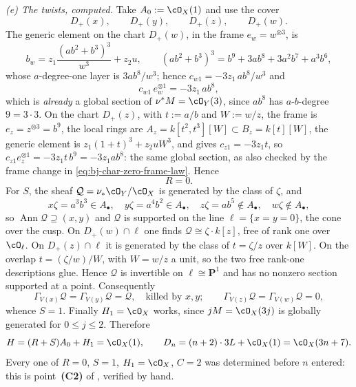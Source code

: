 \begin{example}
\emph{(e) The twists, computed.}  Take $A_0:=\cO_X(1)$ and use the cover
\[
 D_+(x),\qquad D_+(y),\qquad D_+(z),\qquad D_+(w).
\]
The generic element on the chart
$D_+(w)$, in the frame $e_w=w^{\otimes3}$, is
\[
 b_w=z_1\frac{(ab^2+b^3)^3}{w^3}+z_2u ,
 \qquad
 (ab^2+b^3)^3=b^9+3ab^8+3a^2b^7+a^3b^6,
\]
whose $a$-degree-one layer is $3ab^8/w^3$; hence
$c_{w1}=-3z_1\,ab^8/w^3$ and
\[
 c_{w1}\,e_w^{\otimes1}=-3z_1\,ab^8,
\]
which is \emph{already} a global section of $\nu^*M=\cO_Y(3)$, since
$ab^8$ has $a$-$b$-degree $9=3\cdot3$.  On the chart $D_+(z)$,
with $t:=a/b$ and $W:=w/z$, the frame is $e_z=z^{\otimes3}=b^9$, the
local rings are $A_z=k[t^2,t^3][W]\subset B_z=k[t][W]$, the generic
element is $z_1(1+t)^3+z_2uW^3$, and  gives
$c_{z1}=-3z_1t$, so
$c_{z1}e_z^{\otimes1}=-3z_1t\,b^9=-3z_1ab^8$: the same global section, as also checked by the frame change in
\eqref{eq:bj-char-zero-frame-law}.  Hence
\[
 R=0 .
\]
For $S$, the sheaf $\mathcal Q=\nu_*\cO_Y/\cO_X$ is generated by the
class of $\zeta$, and
\[
 x\zeta=a^3b^3\in A_\bullet,
 \quad
 y\zeta=a^4b^2\in A_\bullet,
 \quad
 z\zeta=ab^5\notin A_\bullet,
 \quad
 w\zeta\notin A_\bullet,
\]
so $\operatorname{Ann}\mathcal Q\supseteq(x,y)$ and $\mathcal Q$ is
supported on the line $\ell=\{x=y=0\}$, the cone over the cusp.  On
$D_+(w)\cap\ell$ one finds $\mathcal Q\cong\zeta\cdot k[z]$, free of
rank one over $\cO_\ell$.  On $D_+(z)\cap\ell$ it is generated by
the class of $t=\zeta/z$ over $k[W]$.  On the overlap
$t=(\zeta/w)/W$, with $W=w/z$ a unit, so the two free rank-one
descriptions glue.  Hence $\mathcal Q$ is invertible on
$\ell\cong\mathbf P^1$ and has no nonzero section supported at a point.
Consequently
\[
 \Gamma_{V(x)}\mathcal Q=\Gamma_{V(y)}\mathcal Q=\mathcal Q,
 \quad\text{killed by }x,y;
 \qquad
 \Gamma_{V(z)}\mathcal Q=\Gamma_{V(w)}\mathcal Q=0,
\]
whence $S=1$.  Finally $H_1=\cO_X$ works, since $jM=\cO_X(3j)$ is
globally generated for $0\le j\le2$.  Therefore
\[
 H=(R+S)A_0+H_1=\cO_X(1),
 \qquad
 D_n=(n+2)\cdot3L+\cO_X(1)=\cO_X(3n+7).
\]
Every one of $R=0$, $S=1$, $H_1=\cO_X$, $C=2$ was determined before
$n$ entered: this is point~\textbf{(C2)} of , verified
by hand.


\end{example}
